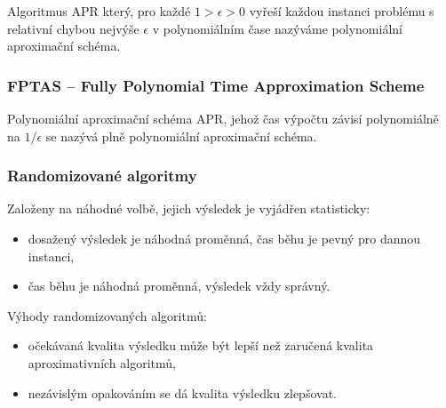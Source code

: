 Algoritmus APR který, pro každé $1 > \epsilon > 0$ vyřeší každou instanci problému s relativní chybou nejvýše $\epsilon$ v polynomiálním čase nazýváme polynomiální aproximační schéma.

\subsubsection{FPTAS -- Fully Polynomial Time Approximation Scheme}

Polynomiální aproximační schéma APR, jehož čas výpočtu závisí polynomiálně na $1/\epsilon$ se nazývá plně polynomiální aproximační schéma.

\subsubsection{Randomizované algoritmy}

Založeny na náhodné volbě, jejich výsledek je vyjádřen statisticky:

\begin{itemize}
    \item dosažený výsledek je náhodná proměnná, čas běhu je pevný pro dannou instanci,
    \item čas běhu je náhodná proměnná, výsledek vždy správný.
\end{itemize}

Výhody randomizovaných algoritmů:

\begin{itemize}
    \item očekávaná kvalita výsledku může být lepší než zaručená kvalita aproximativních algoritmů,
    \item nezávislým opakováním se dá kvalita výsledku zlepšovat.
\end{itemize}
